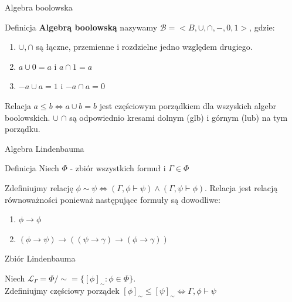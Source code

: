\documentclass{beamer}
\begin{document}
\begin{frame}{Algebra boolowska}
 \begin{block}{Definicja}
 \textbf{Algebrą boolowską} nazywamy \( \mathcal{B}  = < B, \cup, \cap, -, 0, 1 >\), gdzie: 
 \begin{enumerate}
 \item \(\cup, \cap\) są łączne, przemienne i rozdzielne jedno względem drugiego.
 \item \( a \cup 0 = a \) i \( a \cap 1 = a \) 
 \item \( -a \cup a = 1 \) i \( -a \cap a  =  0 \)
 \end{enumerate}
 Relacja \(a \leq b  \Leftrightarrow  a \cup b = b \) jest częściowym porządkiem dla wszyskich algebr boolowskich. \( \cup \) \( \cap \) są odpowiednio kresami dolnym (glb) i górnym (lub) na tym porządku.
 \end{block}
 
\end{frame}

\begin{frame}{Algebra Lindenbauma}
 \begin{block}{Definicja}
 Niech \( \Phi \) - zbiór wszystkich formuł i \( \Gamma \in \Phi \) 
 
 Zdefiniujmy relację  \( \phi \sim \psi \Leftrightarrow (\Gamma, \phi  \vdash \psi) \wedge (\Gamma, \psi \vdash \phi) \).
 Relacja jest relacją równoważności ponieważ następujące formuły są dowodliwe: 
 \begin{enumerate}
 \item \(\phi \rightarrow \phi\)
 \item \((\phi \rightarrow \psi) \rightarrow (( \psi \rightarrow  \gamma ) \rightarrow ( \phi \rightarrow \gamma ))  \) 
 \end{enumerate}
 \end{block}
 
 \begin{block}{Zbiór Lindenbauma}
 
 Niech \( \mathcal{L}_{\Gamma} = \Phi / \sim  = \{ [\phi]_{\sim} :  \phi \in \Phi \}\). \\
 Zdefiniujmy częściowy porządek \( [\phi]_{\sim} \leq [\psi]_{\sim} \Leftrightarrow \Gamma, \phi \vdash \psi \)

 \end{block}
 
\end{frame}
\end{document}
